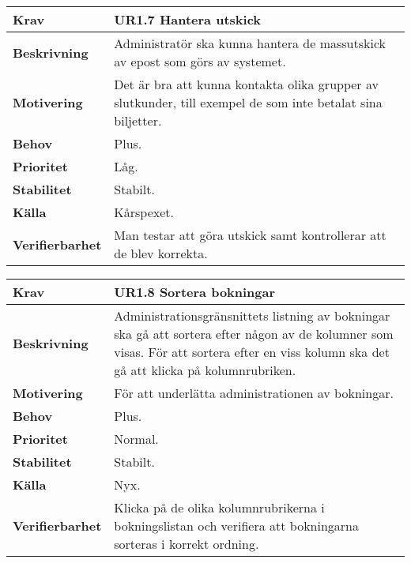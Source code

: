 \documentclass[a4paper, twoside, 11pt, titlepage]{article}
\begin{document}
		\begin {table} [ht] \begin{tabular} { p{2.6cm} p{12.5cm} }
			\hline
			{\sffamily\textbf{Krav}} & {\sffamily\textbf{UR1.7 Hantera utskick }} \\
			\hline
			{\sffamily\textbf{Beskrivning}} & {Administratör ska kunna hantera de massutskick av epost som görs av systemet.} \\
			\hline
			{\sffamily\textbf{Motivering}} & {Det är bra att kunna kontakta olika grupper av slutkunder, till exempel de som inte betalat sina biljetter.} \\
			\hline
			{\sffamily\textbf{Behov}} & {Plus.} \\
			\hline
			{\sffamily\textbf{Prioritet}} & {Låg.} \\
			\hline
			{\sffamily\textbf{Stabilitet}} & {Stabilt.} \\
			\hline
			{\sffamily\textbf{Källa}} & {Kårspexet.} \\
			\hline
			{\sffamily\textbf{Verifierbarhet}} & {Man testar att göra utskick samt kontrollerar att de blev korrekta.} \\
			\hline
		\end{tabular} \end{table} \FloatBarrier
		\vspace{6mm}

		\begin {table} [ht] \begin{tabular} { p{2.6cm} p{12.5cm} }
			\hline
			{\sffamily\textbf{Krav}} & {\sffamily\textbf{UR1.8 Sortera bokningar }} \\
			\hline
			{\sffamily\textbf{Beskrivning}} & {Administrationsgränsnittets listning av bokningar ska gå att sortera efter någon av de kolumner som visas. För att sortera efter en viss kolumn ska det gå att klicka på kolumnrubriken.} \\
			\hline
			{\sffamily\textbf{Motivering}} & {För att underlätta administrationen av bokningar.} \\
			\hline
			{\sffamily\textbf{Behov}} & {Plus.} \\
			\hline
			{\sffamily\textbf{Prioritet}} & {Normal.} \\
			\hline
			{\sffamily\textbf{Stabilitet}} & {Stabilt.} \\
			\hline
			{\sffamily\textbf{Källa}} & {Nyx.} \\
			\hline
			{\sffamily\textbf{Verifierbarhet}} & {Klicka på de olika kolumnrubrikerna i bokningslistan och verifiera att bokningarna sorteras i korrekt ordning.} \\
			\hline
		\end{tabular} \end{table} \FloatBarrier
		\vspace{6mm}
\end{document}

